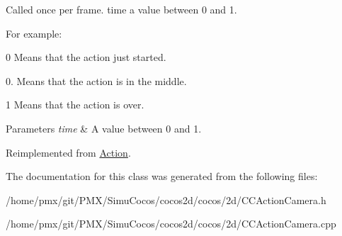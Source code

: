 Called once per frame. time a value between 0 and 1.

For example\+:
\begin{DoxyItemize}
\item 0 Means that the action just started.
\item 0. Means that the action is in the middle.
\item 1 Means that the action is over.
\end{DoxyItemize}


\begin{DoxyParams}{Parameters}
{\em time} & A value between 0 and 1. \\
\hline
\end{DoxyParams}


Reimplemented from \hyperlink{classAction_a937e646e63915e33ad05ba149bfcf239}{Action}.



The documentation for this class was generated from the following files\+:\begin{DoxyCompactItemize}
\item 
/home/pmx/git/\+P\+M\+X/\+Simu\+Cocos/cocos2d/cocos/2d/C\+C\+Action\+Camera.\+h\item 
/home/pmx/git/\+P\+M\+X/\+Simu\+Cocos/cocos2d/cocos/2d/C\+C\+Action\+Camera.\+cpp\end{DoxyCompactItemize}
